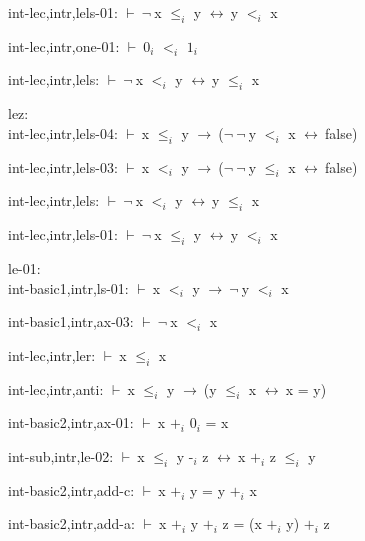 \documentclass[a4paper]{article}
\newcommand{\Fol}{\mbox{$\vdash\ $}}
\newcommand{\Not}{\mbox{$\neg\ $}}
\newcommand{\Imp}{\mbox{$\rightarrow\ $}}
\newcommand{\Equiv}{\mbox{$\leftrightarrow\ $}}
\begin{document}
int-lec,intr,lels-01: 
 \Fol \Not x $\mbox{$\le$}_{i}$ y \Equiv y $\mbox{$<$}_{i}$ x



int-lec,intr,one-01: 
 \Fol $\mbox{0}_{i}$ $\mbox{$<$}_{i}$ $\mbox{1}_{i}$



int-lec,intr,lels: 
 \Fol \Not x $\mbox{$<$}_{i}$ y \Equiv y $\mbox{$\le$}_{i}$ x



\bigskip

lez:\\ int-lec,intr,lels-04: 
 \Fol x $\mbox{$\le$}_{i}$ y \Imp (\Not \Not y $\mbox{$<$}_{i}$ x \Equiv false)



int-lec,intr,lels-03: 
 \Fol x $\mbox{$<$}_{i}$ y \Imp (\Not \Not y $\mbox{$\le$}_{i}$ x \Equiv false)



int-lec,intr,lels: 
 \Fol \Not x $\mbox{$<$}_{i}$ y \Equiv y $\mbox{$\le$}_{i}$ x



int-lec,intr,lels-01: 
 \Fol \Not x $\mbox{$\le$}_{i}$ y \Equiv y $\mbox{$<$}_{i}$ x



\bigskip

le-01:\\ int-basic1,intr,ls-01: 
 \Fol x $\mbox{$<$}_{i}$ y \Imp \Not y $\mbox{$<$}_{i}$ x



int-basic1,intr,ax-03: 
 \Fol \Not x $\mbox{$<$}_{i}$ x



int-lec,intr,ler: 
 \Fol x $\mbox{$\le$}_{i}$ x



int-lec,intr,anti: 
 \Fol x $\mbox{$\le$}_{i}$ y \Imp (y $\mbox{$\le$}_{i}$ x \Equiv x = y)



int-basic2,intr,ax-01: 
 \Fol x $\mbox{+}_{i}$ $\mbox{0}_{i}$ = x



int-sub,intr,le-02: 
 \Fol x $\mbox{$\le$}_{i}$ y $\mbox{-}_{i}$ z \Equiv x $\mbox{+}_{i}$ z $\mbox{$\le$}_{i}$ y



int-basic2,intr,add-c: 
 \Fol x $\mbox{+}_{i}$ y = y $\mbox{+}_{i}$ x



int-basic2,intr,add-a: 
 \Fol x $\mbox{+}_{i}$ y $\mbox{+}_{i}$ z = (x $\mbox{+}_{i}$ y) $\mbox{+}_{i}$ z
\end{document}
